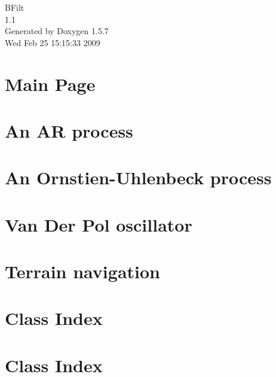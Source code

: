 \documentclass[a4paper]{book}
\begin{document}
\begin{titlepage}
\vspace*{7cm}
\begin{center}
{\Large BFilt \\[1ex]\large 1.1 }\\
\vspace*{1cm}
{\large Generated by Doxygen 1.5.7}\\
\vspace*{0.5cm}
{\small Wed Feb 25 15:15:33 2009}\\
\end{center}
\end{titlepage}
\clearemptydoublepage
{}
\tableofcontents
\clearemptydoublepage
{}
\chapter{Main Page}
\label{index}\hypertarget{index}{}
\chapter{An AR process}
\label{page1}
\hypertarget{page1}{}

\chapter{An Ornstien-Uhlenbeck process}
\label{page2}
\hypertarget{page2}{}

\chapter{Van Der Pol oscillator}
\label{page_3}
\hypertarget{page_3}{}

\chapter{Terrain navigation}
\label{page_4}
\hypertarget{page_4}{}

\chapter{Class Index}

\chapter{Class Index}

\end{document}
